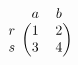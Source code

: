 \documentclass{article}
\begin{document}
\[
\begin{blockarray}{ccc}
 & a & b \\
\begin{block}{c(cc)}
r & 1 & 2 \\
s & 3 & 4 \\
\end{block}
\end{blockarray}
\]
\end{document}
